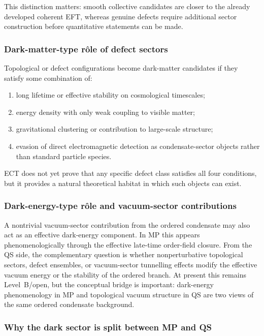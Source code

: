 This distinction matters: smooth collective candidates are closer to
the already developed coherent EFT, whereas genuine defects require
additional sector construction before quantitative statements can be made.

\subsubsection*{Dark-matter-type r\^ole of defect sectors}

Topological or defect configurations become dark-matter candidates if
they satisfy some combination of:
\begin{enumerate}[label=(\roman*)]
  \item long lifetime or effective stability on cosmological timescales;
  \item energy density with only weak coupling to visible matter;
  \item gravitational clustering or contribution to large-scale
    structure;
  \item evasion of direct electromagnetic detection as condensate-sector
    objects rather than standard particle species.
\end{enumerate}
ECT does not yet prove that any specific defect class satisfies all
four conditions, but it provides a natural theoretical habitat in which
such objects can exist.

\subsubsection*{Dark-energy-type r\^ole and vacuum-sector contributions}

A nontrivial vacuum-sector contribution from the ordered condensate
may also act as an effective dark-energy component.
In MP this appears phenomenologically through the effective late-time
order-field closure.
From the QS side, the complementary question is whether nonperturbative
topological sectors, defect ensembles, or vacuum-sector tunnelling
effects modify the effective vacuum energy or the stability of the
ordered branch.
At present this remains Level~B/open, but the conceptual bridge is
important: dark-energy phenomenology in MP and topological vacuum
structure in QS are two views of the same ordered condensate background.

\subsubsection*{Why the dark sector is split between MP and QS}

